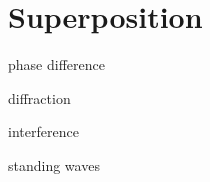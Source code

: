 \documentclass[main.tex]{subfiles}
\begin{document}
\chapter{Superposition}
\begin{content}
\item phase difference
\item diffraction
\item interference
\item standing waves
\end{content}
\end{document}
